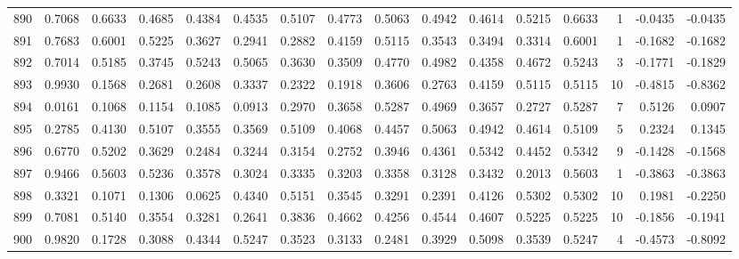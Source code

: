 \begin{tabular}{lrrrrrrrrrrrrrrr}
890 &      0.7068 &  0.6633 &  0.4685 &  0.4384 &  0.4535 &  0.5107 &  0.4773 &  0.5063 &  0.4942 &  0.4614 &   0.5215 &     0.6633 &      1 &                   -0.0435 &                    -0.0435 \\
891 &      0.7683 &  0.6001 &  0.5225 &  0.3627 &  0.2941 &  0.2882 &  0.4159 &  0.5115 &  0.3543 &  0.3494 &   0.3314 &     0.6001 &      1 &                   -0.1682 &                    -0.1682 \\
892 &      0.7014 &  0.5185 &  0.3745 &  0.5243 &  0.5065 &  0.3630 &  0.3509 &  0.4770 &  0.4982 &  0.4358 &   0.4672 &     0.5243 &      3 &                   -0.1771 &                    -0.1829 \\
893 &      0.9930 &  0.1568 &  0.2681 &  0.2608 &  0.3337 &  0.2322 &  0.1918 &  0.3606 &  0.2763 &  0.4159 &   0.5115 &     0.5115 &     10 &                   -0.4815 &                    -0.8362 \\
894 &      0.0161 &  0.1068 &  0.1154 &  0.1085 &  0.0913 &  0.2970 &  0.3658 &  0.5287 &  0.4969 &  0.3657 &   0.2727 &     0.5287 &      7 &                    0.5126 &                     0.0907 \\
895 &      0.2785 &  0.4130 &  0.5107 &  0.3555 &  0.3569 &  0.5109 &  0.4068 &  0.4457 &  0.5063 &  0.4942 &   0.4614 &     0.5109 &      5 &                    0.2324 &                     0.1345 \\
896 &      0.6770 &  0.5202 &  0.3629 &  0.2484 &  0.3244 &  0.3154 &  0.2752 &  0.3946 &  0.4361 &  0.5342 &   0.4452 &     0.5342 &      9 &                   -0.1428 &                    -0.1568 \\
897 &      0.9466 &  0.5603 &  0.5236 &  0.3578 &  0.3024 &  0.3335 &  0.3203 &  0.3358 &  0.3128 &  0.3432 &   0.2013 &     0.5603 &      1 &                   -0.3863 &                    -0.3863 \\
898 &      0.3321 &  0.1071 &  0.1306 &  0.0625 &  0.4340 &  0.5151 &  0.3545 &  0.3291 &  0.2391 &  0.4126 &   0.5302 &     0.5302 &     10 &                    0.1981 &                    -0.2250 \\
899 &      0.7081 &  0.5140 &  0.3554 &  0.3281 &  0.2641 &  0.3836 &  0.4662 &  0.4256 &  0.4544 &  0.4607 &   0.5225 &     0.5225 &     10 &                   -0.1856 &                    -0.1941 \\
900 &      0.9820 &  0.1728 &  0.3088 &  0.4344 &  0.5247 &  0.3523 &  0.3133 &  0.2481 &  0.3929 &  0.5098 &   0.3539 &     0.5247 &      4 &                   -0.4573 &                    -0.8092 \\

\end{tabular}
